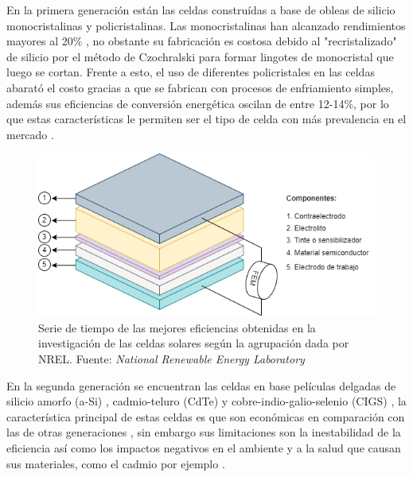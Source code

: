 En la primera generación están las celdas construídas a base de obleas de silicio monocristalinas y policristalinas. Las monocristalinas han alcanzado rendimientos mayores al 20\% \cite{gul2016}, no obstante su fabricación es costosa  \cite{srinivas2015review} debido al "recristalizado" de silicio por el método de Czochralski \cite{yu2019growth} para formar lingotes de monocristal que luego se cortan. Frente a esto, el uso de diferentes policristales en las celdas abarató el costo gracias a que se fabrican con procesos de enfriamiento simples, además sus eficiencias de conversión energética oscilan de entre 12-14\%, por lo que estas características le permiten ser el tipo de celda con más prevalencia en el mercado \cite{sharma2015solar}. 

\begin{figure}[h!]
    \label{img:SerieTiempo}
    \includegraphics[scale=0.6]{img/DSSC.png}
    \caption{Serie de tiempo de las mejores eficiencias obtenidas en la investigación de las celdas solares según la agrupación dada por NREL.
    Fuente: \textit{National Renewable Energy Laboratory} \cite{owidenergy}}
\end{figure}
En la segunda generación se encuentran las celdas en base películas delgadas de silicio amorfo (a-Si) \cite{kaur2016review}, cadmio-teluro (CdTe) \cite{bertolli2008} y cobre-indio-galio-selenio (CIGS) \cite{bagher2015types}, la característica principal de estas celdas es que son económicas en comparación con las de otras generaciones \cite{rathore2021}, sin embargo sus limitaciones son la inestabilidad de la eficiencia \cite{gul2016review} así como los impactos negativos en el ambiente y a la salud que causan sus materiales, como el cadmio por ejemplo \cite{bagher2015types}. 

